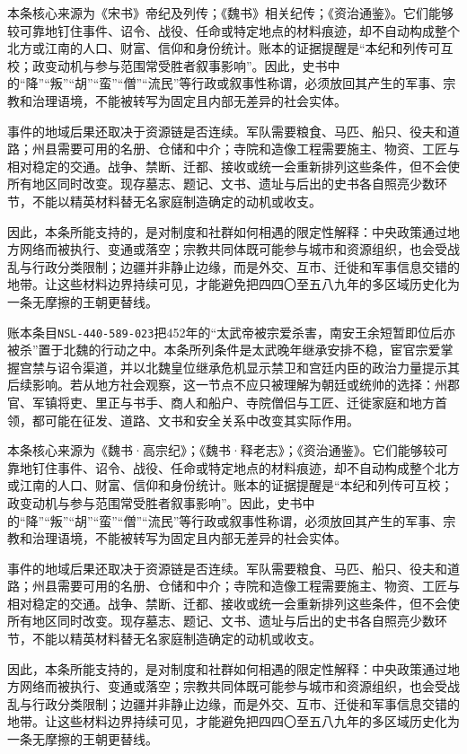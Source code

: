 本条核心来源为《宋书》帝纪及列传；《魏书》相关纪传；《资治通鉴》。它们能够较可靠地钉住事件、诏令、战役、任命或特定地点的材料痕迹，却不自动构成整个北方或江南的人口、财富、信仰和身份统计。账本的证据提醒是“本纪和列传可互校；政变动机与参与范围常受胜者叙事影响”。因此，史书中的“降”“叛”“胡”“蛮”“僧”“流民”等行政或叙事性称谓，必须放回其产生的军事、宗教和治理语境，不能被转写为固定且内部无差异的社会实体。

事件的地域后果还取决于资源链是否连续。军队需要粮食、马匹、船只、役夫和道路；州县需要可用的名册、仓储和中介；寺院和造像工程需要施主、物资、工匠与相对稳定的交通。战争、禁断、迁都、接收或统一会重新排列这些条件，但不会使所有地区同时改变。现存墓志、题记、文书、遗址与后出的史书各自照亮少数环节，不能以精英材料替无名家庭制造确定的动机或收支。

因此，本条所能支持的，是对制度和社群如何相遇的限定性解释：中央政策通过地方网络而被执行、变通或落空；宗教共同体既可能参与城市和资源组织，也会受战乱与行政分类限制；边疆并非静止边缘，而是外交、互市、迁徙和军事信息交错的地带。让这些材料边界持续可见，才能避免把四四〇至五八九年的多区域历史化为一条无摩擦的王朝更替线。

账本条目\texttt{NSL-440-589-023}把452年的“太武帝被宗爱杀害，南安王余短暂即位后亦被杀”置于北魏的行动之中。本条所列条件是太武晚年继承安排不稳，宦官宗爱掌握宫禁与诏令渠道，并以北魏皇位继承危机显示禁卫和宫廷内臣的政治力量提示其后续影响。若从地方社会观察，这一节点不应只被理解为朝廷或统帅的选择：州郡官、军镇将吏、里正与书手、商人和船户、寺院僧侣与工匠、迁徙家庭和地方首领，都可能在征发、道路、文书和安全关系中改变其实际作用。

本条核心来源为《魏书·高宗纪》；《魏书·释老志》；《资治通鉴》。它们能够较可靠地钉住事件、诏令、战役、任命或特定地点的材料痕迹，却不自动构成整个北方或江南的人口、财富、信仰和身份统计。账本的证据提醒是“本纪和列传可互校；政变动机与参与范围常受胜者叙事影响”。因此，史书中的“降”“叛”“胡”“蛮”“僧”“流民”等行政或叙事性称谓，必须放回其产生的军事、宗教和治理语境，不能被转写为固定且内部无差异的社会实体。

事件的地域后果还取决于资源链是否连续。军队需要粮食、马匹、船只、役夫和道路；州县需要可用的名册、仓储和中介；寺院和造像工程需要施主、物资、工匠与相对稳定的交通。战争、禁断、迁都、接收或统一会重新排列这些条件，但不会使所有地区同时改变。现存墓志、题记、文书、遗址与后出的史书各自照亮少数环节，不能以精英材料替无名家庭制造确定的动机或收支。

因此，本条所能支持的，是对制度和社群如何相遇的限定性解释：中央政策通过地方网络而被执行、变通或落空；宗教共同体既可能参与城市和资源组织，也会受战乱与行政分类限制；边疆并非静止边缘，而是外交、互市、迁徙和军事信息交错的地带。让这些材料边界持续可见，才能避免把四四〇至五八九年的多区域历史化为一条无摩擦的王朝更替线。

